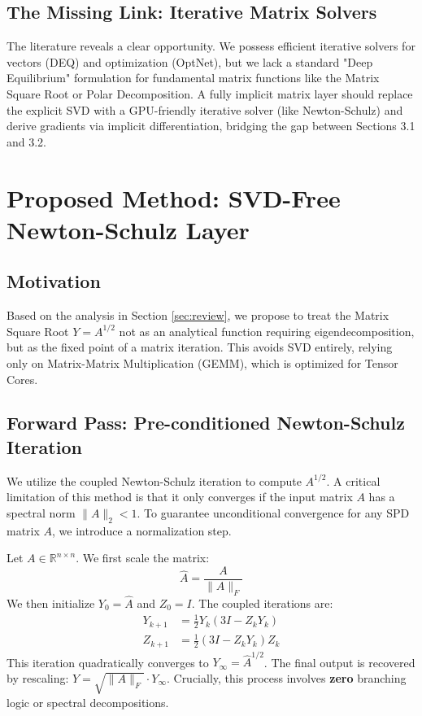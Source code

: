 \documentclass{article}
\newcommand{\R}{\mathbb{R}}
\begin{document}
\subsection{The Missing Link: Iterative Matrix Solvers}
The literature reveals a clear opportunity. We possess efficient iterative solvers for vectors (DEQ) and optimization (OptNet), but we lack a standard "Deep Equilibrium" formulation for fundamental matrix functions like the Matrix Square Root or Polar Decomposition. A fully implicit matrix layer should replace the explicit SVD with a GPU-friendly iterative solver (like Newton-Schulz) and derive gradients via implicit differentiation, bridging the gap between Sections 3.1 and 3.2.

\section{Proposed Method: SVD-Free Newton-Schulz Layer}
\label{sec:method}

\subsection{Motivation}
Based on the analysis in Section \ref{sec:review}, we propose to treat the Matrix Square Root $Y = A^{1/2}$ not as an analytical function requiring eigendecomposition, but as the fixed point of a matrix iteration. This avoids SVD entirely, relying only on Matrix-Matrix Multiplication (GEMM), which is optimized for Tensor Cores.

\subsection{Forward Pass: Pre-conditioned Newton-Schulz Iteration}
We utilize the coupled Newton-Schulz iteration to compute $A^{1/2}$. A critical limitation of this method is that it only converges if the input matrix $A$ has a spectral norm $\|A\|_2 < 1$. To guarantee unconditional convergence for any SPD matrix $A$, we introduce a normalization step.

Let $A \in \R^{n \times n}$. We first scale the matrix:
\begin{equation}
  \hat{A} = \frac{A}{\|A\|_F}
\end{equation}
We then initialize $Y_0 = \hat{A}$ and $Z_0 = I$. The coupled iterations are:
\begin{align}
  Y_{k+1} &= \frac{1}{2} Y_k (3I - Z_k Y_k) \\
  Z_{k+1} &= \frac{1}{2} (3I - Z_k Y_k) Z_k
\end{align}
This iteration quadratically converges to $Y_\infty = \hat{A}^{1/2}$. The final output is recovered by rescaling: $Y = \sqrt{\|A\|_F} \cdot Y_\infty$. Crucially, this process involves \textbf{zero} branching logic or spectral decompositions.
\end{document}
